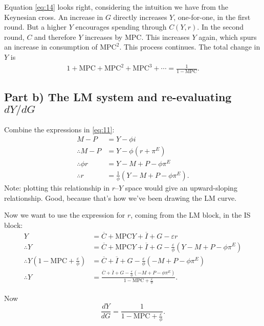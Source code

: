 \documentclass[12pt]{pracjourn_rwr}
\theoremstyle{definition}
\theoremstyle{remark}
\begin{document}
Equation \eqref{eq:14} looks right, considering the intuition we have from the Keynesian cross.
An increase in $G$ directly increases $Y$, one-for-one, in the first round.
But a higher $Y$ encourages spending through $C(Y,r)$.
In the second round, $C$ and therefore $Y$ increases by $\text{MPC}$.
This increases $Y$ again, which spurs an increase in consumption of $\text{MPC}^{2}$.
This process continues.
The total change in $Y$ is
\begin{align*}
1 + \text{MPC} + \text{MPC}^{2} + \text{MPC}^{3} + \cdots = \frac{1}{1-\text{MPC}}.
\end{align*}

\subsection{Part b) The LM system and re-evaluating $dY / dG$}

Combine the expressions in \eqref{eq:11}:
\begin{align*}
M - P &= Y - \phi i \\
\therefore M - P &= Y - \phi \left( r + \pi^{E} \right) \\
\therefore \phi r &= Y - M + P - \phi \pi^{E} \\
\therefore r &= \frac{1}{\phi} \left( Y - M + P - \phi \pi^{E} \right).
\end{align*}
Note: plotting this relationship in $r$--$Y$ space would give an upward-sloping relationship.
Good, because that's how we've been drawing the LM curve.

Now we want to use the expression for $r$, coming from the LM block,
in the IS block:
\begin{align*}
Y &= \overline{C} + \text{MPC} Y + \overline{I} + G - \varepsilon r \\
\therefore Y &=
\overline{C} + \text{MPC} Y + \overline{I} + G - \frac{\varepsilon}{\phi} \left( Y - M + P - \phi \pi^{E} \right) \\
\therefore Y \left( 1 - \text{MPC} + \frac{\varepsilon}{\phi} \right) &=
\overline{C} + \overline{I} + G - \frac{\varepsilon}{\phi} \left(- M + P - \phi \pi^{E} \right) \\
\therefore Y &= \frac{\overline{C} + \overline{I} + G - \frac{\varepsilon}{\phi} \left(- M + P - \phi \pi^{E} \right)}{1 - \text{MPC} + \frac{\varepsilon}{\phi}}.
\end{align*}

Now
\begin{equation}
\label{eq:15}
\frac{d Y}{d G} = \frac{1}{1 - \text{MPC} + \frac{\varepsilon}{\phi}}.
\end{equation}
\end{document}
